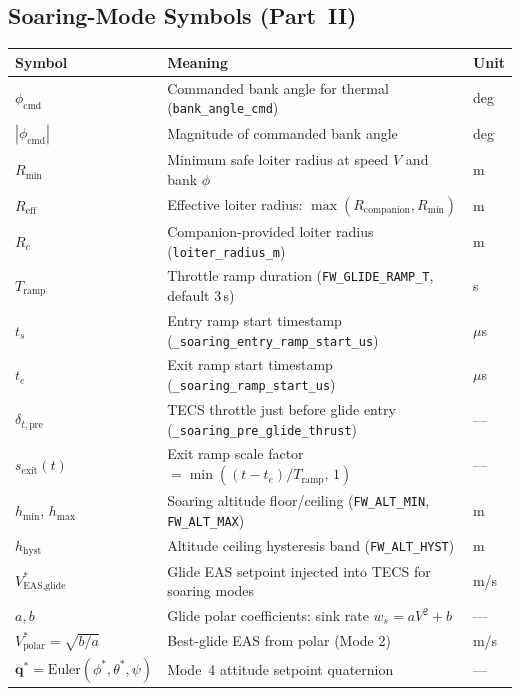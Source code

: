 \documentclass[12pt,a4paper]{article}
\begin{document}
\subsection*{Soaring-Mode Symbols (Part~II)}
\begin{center}\begin{tabular}{lll}\toprule
Symbol & Meaning & Unit \\\midrule
$\phi_{\text{cmd}}$ & Commanded bank angle for thermal (\texttt{bank\_angle\_cmd}) & deg \\
$|\phi_{\text{cmd}}|$ & Magnitude of commanded bank angle & deg \\
$R_{\min}$ & Minimum safe loiter radius at speed $V$ and bank $\phi$ & m \\
$R_{\text{eff}}$ & Effective loiter radius: $\max(R_{\text{companion}}, R_{\min})$ & m \\
$R_c$ & Companion-provided loiter radius (\texttt{loiter\_radius\_m}) & m \\
$T_{\text{ramp}}$ & Throttle ramp duration (\texttt{FW\_GLIDE\_RAMP\_T}, default 3\,s) & s \\
$t_s$ & Entry ramp start timestamp (\texttt{\_soaring\_entry\_ramp\_start\_us}) & $\mu$s \\
$t_e$ & Exit ramp start timestamp (\texttt{\_soaring\_ramp\_start\_us}) & $\mu$s \\
$\delta_{t,\text{pre}}$ & TECS throttle just before glide entry (\texttt{\_soaring\_pre\_glide\_thrust}) & --- \\
$s_{\text{exit}}(t)$ & Exit ramp scale factor $= \min((t-t_e)/T_{\text{ramp}},\,1)$ & --- \\
$h_{\min}$, $h_{\max}$ & Soaring altitude floor/ceiling (\texttt{FW\_ALT\_MIN}, \texttt{FW\_ALT\_MAX}) & m \\
$h_{\text{hyst}}$ & Altitude ceiling hysteresis band (\texttt{FW\_ALT\_HYST}) & m \\
$V^*_{\text{EAS,glide}}$ & Glide EAS setpoint injected into TECS for soaring modes & m/s \\
$a, b$ & Glide polar coefficients: sink rate $w_s = aV^2 + b$ & --- \\
$V^*_{\text{polar}} = \sqrt{b/a}$ & Best-glide EAS from polar (Mode 2) & m/s \\
$\mathbf{q}^* = \text{Euler}(\phi^*,\theta^*,\psi)$ & Mode~4 attitude setpoint quaternion & --- \\
\bottomrule\end{tabular}\end{center}
\end{document}
